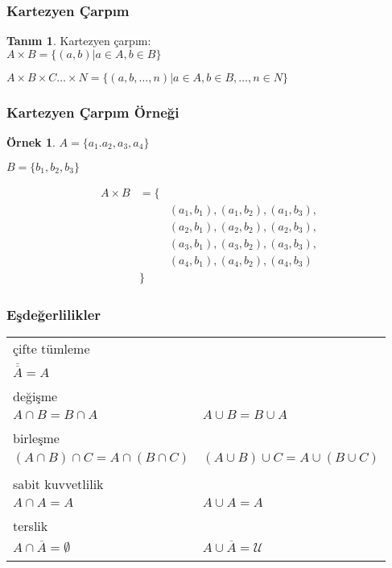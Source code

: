 \documentclass[dvipsnames]{beamer}
\theoremstyle{definition}
\newtheorem{tanim}[theorem]{Tanım}
\theoremstyle{example}
\newtheorem{ornek}[theorem]{Örnek}
\theoremstyle{plain}
\begin{document}
\begin{frame}
  \frametitle{Kartezyen Çarpım}

  \begin{tanim}
    \alert{Kartezyen çarpım}:\\
      $A \times B = \{ (a,b) | a \in A, b \in B \}$

      \medskip
      $A \times B \times C \dots \times N =
        \{ (a,b,\dots,n) | a \in A, b \in B, \dots, n \in N \}$
  \end{tanim}
\end{frame}

\begin{frame}
  \frametitle{Kartezyen Çarpım Örneği}

  \begin{ornek}
    $A = \{a_1.a_2,a_3,a_4\}$

    $B = \{b_1,b_2,b_3\}$

    \medskip
    \begin{eqnarray*}
      A \times B & = \{ & \\
                 &      & (a_1,b_1),(a_1,b_2),(a_1,b_3),\\
                 &      & (a_2,b_1),(a_2,b_2),(a_2,b_3),\\
                 &      & (a_3,b_1),(a_3,b_2),(a_3,b_3),\\
                 &      & (a_4,b_1),(a_4,b_2),(a_4,b_3)\\
                 &  \}  &
    \end{eqnarray*}
  \end{ornek}
\end{frame}

\begin{frame}
  \frametitle{Eşdeğerlilikler}

  \begin{tabular}{ll}
    \alert{çifte tümleme} &\\
      $\overline{\overline{A}} = A$\\\\
    \pause
    \alert{değişme} &\\
      $A \cap B = B \cap A$ &
      $A \cup B = B \cup A$\\\\
    \pause
    \alert{birleşme} &\\
      $(A \cap B) \cap C = A \cap (B \cap C)$ &
      $(A \cup B) \cup C = A \cup (B \cup C)$\\\\
    \pause
    \alert{sabit kuvvetlilik} &\\
      $A \cap A = A$ &
      $A \cup A = A$\\\\
    \pause
    \alert{terslik} &\\
      $A \cap \overline{A} = \emptyset$ &
      $A \cup \overline{A} = \mathcal{U}$\\\\
  \end{tabular}
\end{frame}
\end{document}
